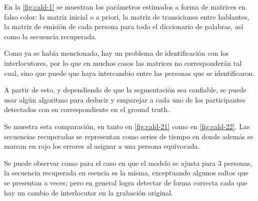 En la \autoref{fig:cald-1} se muestran los parámetros estimados a forma de matrices en falso color: la matriz inicial o a priori, la matriz de transiciones entre hablantes, la matriz de emisión de cada persona para todo el diccionario de palabras, así como la secuencia recuperada.

Como ya se había mencionado, hay un problema de identificación con los interlocutores, por lo que en muchos casos las matrices no corresponderán tal cual, sino que puede que haya intercambio entre las personas que se identificaron.

A partir de esto, y dependiendo de que la segmentación sea confiable, se puede usar algún algoritmo para deducir y emparejar a cada uno de los participantes detectados con su correspondiente en el ground truth.

Se muestra esta comparación, en tanto en \autoref{fig:cald-21} como en \autoref{fig:cald-22}. Las secuencias recuperadas se representan como series de tiempo en donde además se marcan en rojo los errores al asignar a una persona equivocada.

Se puede observar como para el caso en que el modelo se ajusta para 3 personas, la secuencia recuperada en esencia es la misma, exceptuando algunos saltos que se presentan a veces; pero en general logra detectar de forma correcta cada que hay un cambio de interlocutor en la grabación original.

